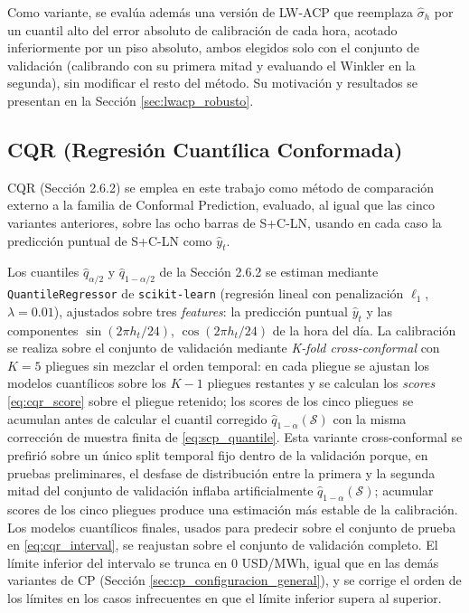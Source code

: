 Como variante, se evalúa además una versión de LW-ACP que reemplaza $\hat\sigma_h$ por un cuantil alto del error absoluto de calibración de cada hora, acotado inferiormente por un piso absoluto, ambos elegidos solo con el conjunto de validación (calibrando con su primera mitad y evaluando el Winkler en la segunda), sin modificar el resto del método. Su motivación y resultados se presentan en la Sección \ref{sec:lwacp_robusto}.

\subsection{CQR (Regresión Cuantílica Conformada)}

CQR (Sección 2.6.2) se emplea en este trabajo como método de comparación externo a la familia de Conformal Prediction, evaluado, al igual que las cinco variantes anteriores, sobre las ocho barras de S+C-LN, usando en cada caso la predicción puntual de S+C-LN como $\hat{y}_t$.

Los cuantiles $\hat{q}_{\alpha/2}$ y $\hat{q}_{1-\alpha/2}$ de la Sección 2.6.2 se estiman mediante \texttt{QuantileRegressor} de \texttt{scikit-learn} (regresión lineal con penalización $\ell_1$, $\lambda = 0.01$), ajustados sobre tres \textit{features}: la predicción puntual $\hat{y}_t$ y las componentes $\sin(2\pi h_t/24)$, $\cos(2\pi h_t/24)$ de la hora del día. La calibración se realiza sobre el conjunto de validación mediante \textit{K-fold cross-conformal} con $K=5$ pliegues sin mezclar el orden temporal: en cada pliegue se ajustan los modelos cuantílicos sobre los $K-1$ pliegues restantes y se calculan los \textit{scores} \eqref{eq:cqr_score} sobre el pliegue retenido; los scores de los cinco pliegues se acumulan antes de calcular el cuantil corregido $\hat{q}_{1-\alpha}(\mathcal{S})$ con la misma corrección de muestra finita de \eqref{eq:scp_quantile}. Esta variante cross-conformal se prefirió sobre un único split temporal fijo dentro de la validación porque, en pruebas preliminares, el desfase de distribución entre la primera y la segunda mitad del conjunto de validación inflaba artificialmente $\hat{q}_{1-\alpha}(\mathcal{S})$; acumular scores de los cinco pliegues produce una estimación más estable de la calibración. Los modelos cuantílicos finales, usados para predecir sobre el conjunto de prueba en \eqref{eq:cqr_interval}, se reajustan sobre el conjunto de validación completo. El límite inferior del intervalo se trunca en 0 USD/MWh, igual que en las demás variantes de CP (Sección \ref{sec:cp_configuracion_general}), y se corrige el orden de los límites en los casos infrecuentes en que el límite inferior supera al superior.

